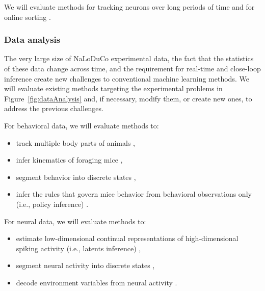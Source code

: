We will evaluate methods for tracking neurons over long periods of time
\citep[e.g.,][]{yuanEtAl24,vanBeestEtAl24} and for online sorting
\citep[e.g.,][]{rutishauserEtAl06,santhanamEtAl04}.

\subsubsection{Data analysis}

The very large size of NaLoDuCo experimental data, the fact that the statistics
of these data change across time, and the requirement for real-time and
close-loop inference create new challenges to conventional machine learning
methods.
%
We will evaluate existing methods targeting the experimental problems
in Figure~\ref{fig:dataAnalysis} and, if necessary, modify them, or create new
ones, to address the previous challenges.

For behavioral data, we will evaluate methods to:

\begin{itemize}

    \item track multiple body parts of
animals \citep[e.g.,][and a switching-linear-dyanamical method using RFIDs that
we will develop]{mathisEtAl18,pereiraEtAl22,bidermanEtAl24},

    \item infer kinematics of foraging mice \citep[e.g.,][]{ldspython,challaEtAl11},

    \item segment behavior into discrete states \citep[e.g.,][and a hierarchical HMM
that we will develop]{wiltschkoEtAl15,hsuAndYttri21},

    \item infer the rules that govern mice behavior from behavioral observations
only (i.e., policy inference) \citep[e.g.,][]{ziebartEtAl08,zhuEtAl23}.

\end{itemize}

For neural data, we will evaluate methods to:

\begin{itemize}

    \item estimate low-dimensional continual representations of
        high-dimensional spiking activity (i.e., latents inference)
        \citep[e.g.,][]{mackeEtAl11,dunckerAndSahani18,pandarinathEtAl18,saniEtAl21},

    \item segment neural activity into discrete states
        \citep[e.g.,][]{chenEtAl09,escolaEtAl11},

    \item decode environment variables from neural activity
        \citep[e.g.,][]{dengEtAl15,kloostermanEtAl14,tampuuEtAl19}.

\end{itemize}


